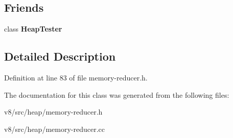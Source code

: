 \subsection*{Friends}
\begin{DoxyCompactItemize}
\item 
\mbox{\label{classv8_1_1internal_1_1MemoryReducer_aee0aab59f992bea8603b7be9e9b2f30d}} 
class {\bfseries Heap\+Tester}
\end{DoxyCompactItemize}


\subsection{Detailed Description}


Definition at line 83 of file memory-\/reducer.\+h.



The documentation for this class was generated from the following files\+:\begin{DoxyCompactItemize}
\item 
v8/src/heap/memory-\/reducer.\+h\item 
v8/src/heap/memory-\/reducer.\+cc\end{DoxyCompactItemize}
